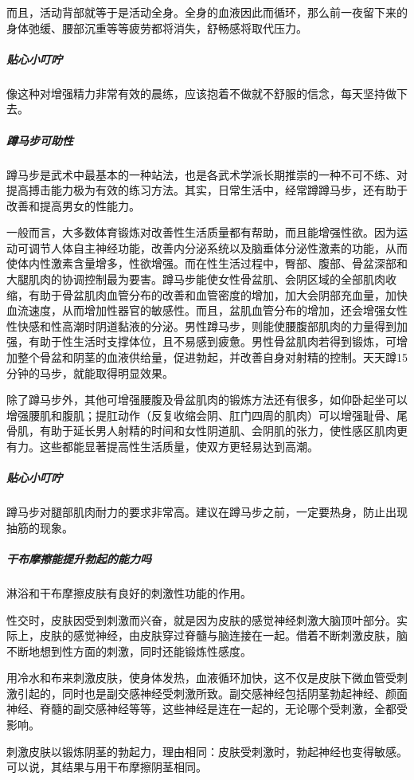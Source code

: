 而且，活动背部就等于是活动全身。全身的血液因此而循环，那么前一夜留下来的身体弛缓、腰部沉重等等疲劳都将消失，舒畅感将取代压力。

\subparagraph{贴心小叮咛}

像这种对增强精力非常有效的晨练，应该抱着不做就不舒服的信念，每天坚持做下去。

\subparagraph{蹲马步可助性}

蹲马步是武术中最基本的一种站法，也是各武术学派长期推崇的一种不可不练、对提高搏击能力极为有效的练习方法。其实，日常生活中，经常蹲蹲马步，还有助于改善和提高男女的性能力。

一般而言，大多数体育锻炼对改善性生活质量都有帮助，而且能增强性欲。因为运动可调节人体自主神经功能，改善内分泌系统以及脑垂体分泌性激素的功能，从而使体内性激素含量增多，性欲增强。而在性生活过程中，臀部、腹部、骨盆深部和大腿肌肉的协调控制最为要害。蹲马步能使女性骨盆肌、会阴区域的全部肌肉收缩，有助于骨盆肌肉血管分布的改善和血管密度的增加，加大会阴部充血量，加快血流速度，从而增加性器官的敏感性。而且，盆肌血管分布的增加，还会增强女性性快感和性高潮时阴道黏液的分泌。男性蹲马步，则能使腰腹部肌肉的力量得到加强，有助于性生活时支撑体位，且不易感到疲惫。男性骨盆肌肉若得到锻炼，可增加整个骨盆和阴茎的血液供给量，促进勃起，并改善自身对射精的控制。天天蹲15分钟的马步，就能取得明显效果。

除了蹲马步外，其他可增强腰腹及骨盆肌肉的锻炼方法还有很多，如仰卧起坐可以增强腰肌和腹肌；提肛动作（反复收缩会阴、肛门四周的肌肉）可以增强耻骨、尾骨肌，有助于延长男人射精的时间和女性阴道肌、会阴肌的张力，使性感区肌肉更有力。这些都能显著提高性生活质量，使双方更轻易达到高潮。

\subparagraph{贴心小叮咛}

蹲马步对腿部肌肉耐力的要求非常高。建议在蹲马步之前，一定要热身，防止出现抽筋的现象。

\subparagraph{干布摩擦能提升勃起的能力吗}

淋浴和干布摩擦皮肤有良好的刺激性功能的作用。

性交时，皮肤因受到刺激而兴奋，就是因为皮肤的感觉神经刺激大脑顶叶部分。实际上，皮肤的感觉神经，由皮肤穿过脊髓与脑连接在一起。借着不断刺激皮肤，脑不断地想到性方面的刺激，同时还能锻炼性感度。

用冷水和布来刺激皮肤，使身体发热，血液循环加快，这不仅是皮肤下微血管受刺激引起的，同时也是副交感神经受刺激所致。副交感神经包括阴茎勃起神经、颜面神经、脊髓的副交感神经等等，这些神经是连在一起的，无论哪个受刺激，全都受影响。

刺激皮肤以锻炼阴茎的勃起力，理由相同：皮肤受刺激时，勃起神经也变得敏感。可以说，其结果与用干布摩擦阴茎相同。

